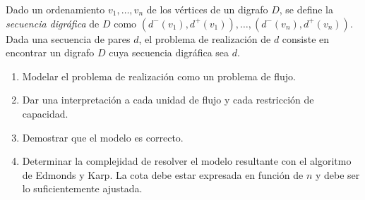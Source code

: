 
 \item Dado un ordenamiento $v_1, \ldots, v_n$ de los vértices de un digrafo $D$, se define la \emph{secuencia digráfica} de $D$ como $(d^-(v_1), d^+(v_1)), \ldots, (d^-(v_n), d^+(v_n))$.
 Dada una secuencia de pares $d$, el problema de realización de $d$ consiste en encontrar un digrafo $D$ cuya secuencia digráfica sea $d$.
 \begin{enumerate}[label=$\alph*)$,ref=$\alph*)$]
  \item Modelar el problema de realización como un problema de flujo.
  \item Dar una interpretación a cada unidad de flujo y cada restricción de capacidad.
  \item Demostrar que el modelo es correcto.
  \item Determinar la complejidad de resolver el modelo resultante con el algoritmo de Edmonds y Karp.  La cota debe estar expresada en función de $n$ y debe ser lo suficientemente ajustada.
 \end{enumerate}
  

